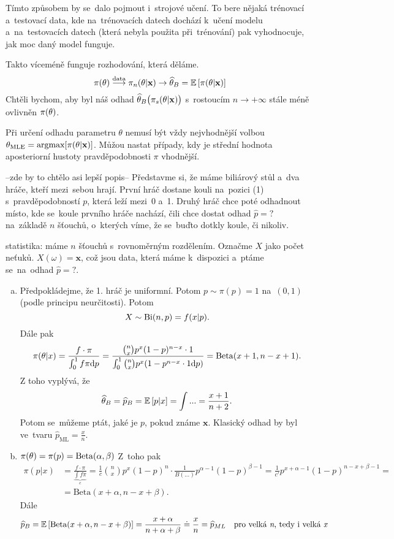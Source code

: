 

\begin{remark}
	Tímto způsobem by se~dalo pojmout i~strojové učení. To bere nějaká trénovací a~testovací data, kde na~trénovacích datech dochází k~učení modelu a~na~testovacích datech (která nebyla použita při~trénování) pak vyhodnocuje, jak moc daný model funguje.
\end{remark}
Takto víceméně funguje rozhodování, která děláme. 
$$ \pi(\theta)\stackrel{\text{data}}{\longrightarrow}\pi_n(\theta|\textbf{x})\to \widehat{\theta}_B=\mathbb{E}\left[ \pi(\theta|\textbf{x}) \right]$$
Chtěli bychom, aby byl náš odhad $\widehat{\theta}_B\big( \pi_s(\theta|\textbf{x}) \big)$ s~rostoucím $n\to+\infty$ stále méně ovlivněn $\pi(\theta)$.
\begin{remark}
Při určení odhadu parametru $ \theta $ nemusí být vždy nejvhodnější volbou $ \theta_{\text{MLE}} = \text{argmax}[\pi(\theta|\textbf{x})]$. Můžou nastat případy, kdy je střední hodnota aposteriorní hustoty pravděpodobnosti $ \pi $ vhodnější.

\end{remark}


\begin{example} --zde by to chtělo asi lepší popis--
	Představme si, že máme biliárový stůl a~dva hráče, kteří mezi~sebou hrají. První hráč dostane kouli na~pozici (1) s~pravděpodobností $p$, která leží mezi~0 a~1. Druhý hráč chce poté odhadnout místo, kde se~koule prvního hráče nachází, čili chce dostat odhad $\widehat{p}=?$ na~základě $n$ šťouchů, o~kterých víme, že se~buďto dotkly koule, či nikoliv. 
	
	statistika: máme $n$ šťouchů s~rovnoměrným rozdělením. Označme $X$ jako počet neťuků. $X(\omega)=\textbf{x}$, což jsou data, která máme k~dispozici a~ptáme se~na~odhad $\widehat{p}=?$.
	
	
	
	\begin{enumerate}[a)]
		\item Předpokládejme, že 1. hráč je uniformní. Potom $p\sim\pi(p)=1$ na~$(0,1)$ (podle principu neurčitosti). Potom
		$$ X\sim\mathrm{Bi}(n,p)=f(x|p).$$
		Dále pak 
		$$ \pi(\theta|x)=\frac{f\cdot\pi}{\int_0^1 f\pi\mathrm{d} p}=\frac{\binom{n}{x}p^x(1-p)^{n-x}\cdot 1}{\int_0^1 \binom{n}{x}p^x(1-p^{n-x}\cdot1 \mathrm{d} p)}=\mathrm{Beta}(x+1,n-x+1).$$
		Z toho vyplývá, že
		$$ \widehat{\theta}_B=\widehat{p}_B=\mathbb{E}\left[ p|x \right]=\int...=\frac{x+1}{n+2}.$$
		Potom se~můžeme ptát, jaké je $p$, pokud známe $\textbf{x}$. Klasický odhad by byl ve~tvaru $\widehat{p}_{\mathrm{ML}}=\frac{x}{n}$.
		\item $\pi(\theta)=\pi(p)=\mathrm{Beta}(\alpha,\beta)$ Z~toho pak 
		\[
		\begin{split}
		\pi(p|x)&=\frac{f\cdot\pi}{\underbrace{\int f\pi}_c}=\frac{1}{c}\binom{n}{x}p^x(1-p)^n\cdot \frac{1}{B(...)}p^{\alpha-1}(1-p)^{\beta-1}=\frac{1}{c'}p^{x+\alpha-1}(1-p)^{n-x+\beta-1}=\\&=\mathrm{Beta}(x+\alpha,n-x+\beta).
		\end{split}
		\] 
		Dále
		$$ \widehat{p}_B=\mathbb{E}\left[ \mathrm{Beta}(x+\alpha,n-x+\beta) \right]=\frac{x+\alpha}{n+\alpha+\beta}\doteq\frac{x}{n} = \widehat{p}_{ML} ~~~\text{pro velká \textit{n}, tedy i~velká \textit{x}}$$
	\end{enumerate}
\end{example}

